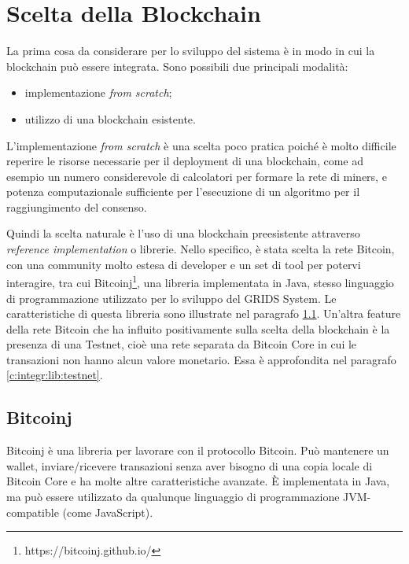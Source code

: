\section{Scelta della Blockchain}
\label{c:integr:lib}

La prima cosa da considerare per lo sviluppo del sistema è in modo in cui la blockchain può essere integrata. Sono possibili due principali modalità:
\begin{itemize}
    \item implementazione \textit{from scratch};
    \item utilizzo di una blockchain esistente.
\end{itemize}

L'implementazione \textit{from scratch} è una scelta poco pratica poiché è molto difficile reperire le risorse necessarie per il deployment di una blockchain, come ad esempio un numero considerevole di calcolatori per formare la rete di miners, e potenza computazionale sufficiente per l'esecuzione di un algoritmo per il raggiungimento del consenso.

Quindi la scelta naturale è l'uso di una blockchain preesistente attraverso \textit{reference implementation} o librerie. Nello specifico, è stata scelta la rete Bitcoin, con una community molto estesa di developer e un set di tool per potervi interagire, tra cui Bitcoinj\footnote{https://bitcoinj.github.io/}, una libreria implementata in Java, stesso linguaggio di programmazione utilizzato per lo sviluppo del GRIDS System. Le caratteristiche di questa libreria sono illustrate nel paragrafo \ref{c:integr:lib:bitcoinj}.
Un'altra feature della rete Bitcoin che ha influito positivamente sulla scelta della blockchain è la presenza di una Testnet, cioè una rete separata da Bitcoin Core in cui le transazioni non hanno alcun valore monetario. Essa è approfondita nel paragrafo \ref{c:integr:lib:testnet}.


\subsection{Bitcoinj}
\label{c:integr:lib:bitcoinj}

Bitcoinj è una libreria per lavorare con il protocollo Bitcoin. Può mantenere un wallet, inviare/ricevere transazioni senza aver bisogno di una copia locale di Bitcoin Core e ha molte altre caratteristiche avanzate. È implementata in Java, ma può essere utilizzato da qualunque linguaggio di programmazione JVM-compatible (come JavaScript).

